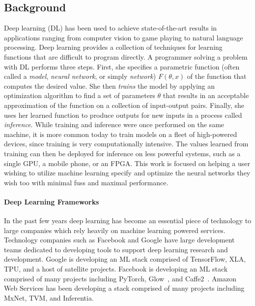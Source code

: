 \subsection{Background}

Deep learning (DL) has been used to achieve state-of-the-art results in
  applications ranging from computer vision to game
  playing to natural language processing.
Deep learning provides a collection of techniques for learning functions that are difficult
  to program directly.
A programmer solving a problem with DL performs three steps.
First, she specifies a parametric function (often called a \textit{model},
  \textit{neural network}, or simply \textit{network}) $F(\theta, x)$ of the function
  that computes the desired value.
She then \textit{trains} the model by applying an optimization algorithm to find a set of
  parameters $\theta$ that results in an acceptable approximation of the function on a
  collection of input-output pairs.
Finally, she uses her learned function to produce outputs for new inputs in
  a process called \textit{inference}.
While training and inference were once performed on the same machine,
  it is more common today to train models on a fleet of high-powered devices,
  since training is very computationally intensive.
The values learned from training can then be deployed for inference on less powerful systems,
  such as a single GPU, a mobile phone, or an FPGA.
This work is focused on helping a user wishing to utilize machine learning specify and optimize
  the neural networks they wish too with minimal fuss and maximal performance.

\paragraph{Deep Learning Frameworks}

In the past few years deep learning has become an essential
  piece of technology to large companies which rely heavily
  on machine learning powered services.
Technology companies such as Facebook and Google have large development
  teams dedicated to developing tools to support deep learning research
  and development.
Google is developing an ML stack comprised of
  TensorFlow, XLA, TPU, and a host of satellite projects.
Facebook is developing an ML stack comprised of
  many projects including PyTorch,
  Glow~\cite{glow}, and Caffe2~\cite{pytorch_caffe2}.
Amazon Web Services has been developing a stack
  comprised of many projects including
  MxNet, TVM, and Inferentia.

